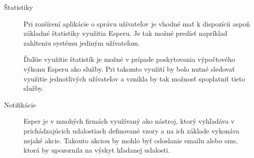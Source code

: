 \begin{description}
		\item[Štatistiky]
		Pri rozšírení aplikácie o správu užívateľov je vhodné mať k dispozícii aspoň základné štatistiky využitia Esperu. Je tak možné predísť napríklad zahlteniu systému jediným užívateľom.
		
		Ďalšie využitie štatistík je možné v prípade poskytovania výpočtového výkonu Esperu ako služby. Pri takomto využití by bolo nutné sledovať využitie jednotlivých užívateľov a vznikla by tak možnosť spoplatniť tieto služby.
		
		\item[Notifikácie] 
		Esper je v mnohých firmách využívaný ako nástroj, ktorý vyhľadáva v prichádzajúcich udalostiach definované vzory a na ich základe vykonáva nejaké akcie. Takouto akciou by mohlo byť odoslanie emailu alebo sms, ktorá by upozornila na výskyt hľadanej udalosti.
		
	\end{description}


